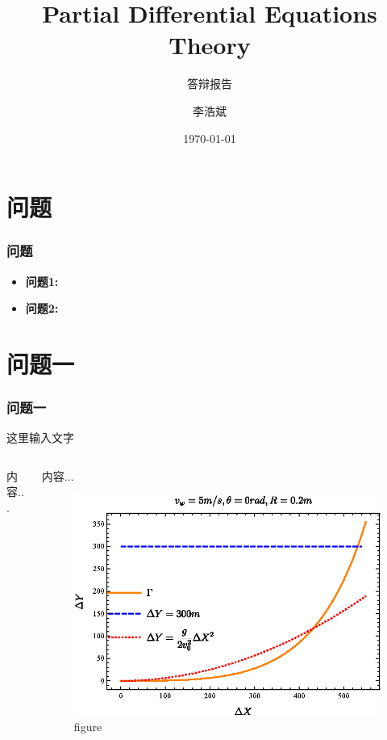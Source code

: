 \documentclass{beamer}
\title[title]{Partial Differential Equations Theory}
\subtitle{答辩报告} %
\author[数学与统计学院]{李浩斌}
\institute[信阳师范大学]{信息与计算科学}
\date[\today] %
{\today}
\begin{document}
	\frame{\titlepage}
	
	
\section{问题}
	\begin{frame}
		\frametitle{问题}
		\begin{itemize}
			\item \textbf{问题1:}
			\item \textbf{问题2:}
		\end{itemize}
	\end{frame}
	
\section{问题一}
	\begin{frame}
		\frametitle{问题一}
		这里输入文字
		\begin{columns}
			\begin{column}{0.5\textwidth}
				内容...
			\end{column}
			
			\begin{column}{0.5\textwidth}
				内容...
				\begin{figure}
					\centering
					\includegraphics[width=\textwidth]{figure/hlx-q1}
					\caption{figure}
					\label{fig:hlx}
				\end{figure}
			\end{column}
		\end{columns}
	\end{frame}
	
\end{document}
